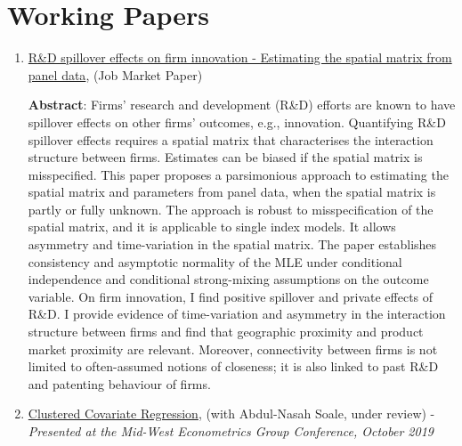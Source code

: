 \documentclass[12pt,letterpaper]{article}
\begin{document}
\section*{Working Papers} %
\begin{enumerate}
	\item  \href{https://estsyawo.github.io/Tsyawo_JMP.pdf#}{R\&D spillover effects on firm innovation - Estimating the spatial matrix from panel data}, (Job Market Paper)
	
	\textbf{Abstract}: Firms’ research and development (R\&D) efforts are known to have spillover effects on other firms’ outcomes, e.g., innovation. Quantifying R\&D spillover effects requires a spatial matrix
	that characterises the interaction structure between firms. Estimates can be biased if the
	spatial matrix is misspecified. This paper proposes a parsimonious approach to estimating
	the spatial matrix and parameters from panel data, when the spatial matrix is partly or fully
	unknown. The approach is robust to misspecification of the spatial matrix, and it is applicable
	to single index models. It allows asymmetry and time-variation in the spatial matrix. The paper
	establishes consistency and asymptotic normality of the MLE under conditional independence
	and conditional strong-mixing assumptions on the outcome variable. On firm innovation, I
	find positive spillover and private effects of R\&D. I provide evidence of time-variation and
	asymmetry in the interaction structure between firms and find that geographic proximity and
	product market proximity are relevant. Moreover, connectivity between firms is not limited to
	often-assumed notions of closeness; it is also linked to past R\&D and patenting behaviour of
	firms.
	
	\item \href{https://papers.ssrn.com/sol3/papers.cfm?abstract_id=3394012}{Clustered Covariate Regression}, (with Abdul-Nasah Soale, under review) - \textit{Presented at the Mid-West Econometrics Group Conference, October 2019}
	
	

\end{enumerate}
\end{document}
